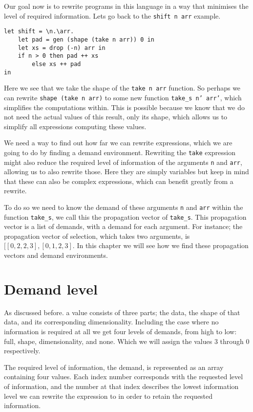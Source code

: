 \documentclass[../main.tex]{subfiles}
\begin{document}
Our goal now is to rewrite programs in this language in a way that minimises the level of required information. Lets go back to the \texttt{shift n arr} example.
\begin{verbatim}
let shift = \n.\arr.
    let pad = gen (shape (take n arr)) 0 in
    let xs = drop (-n) arr in
    if n > 0 then pad ++ xs
        else xs ++ pad
in
\end{verbatim}
%
Here we see that we take the shape of the \texttt{take n arr} function. So perhaps we can rewrite \texttt{shape (take n arr)} to some new function \texttt{take_s n' arr'}, which simplifies the computations within. This is possible because we know that we do not need the actual values of this result, only its shape, which allows us to simplify all expressions computing these values.

We need a way to find out how far we can rewrite expressions, which we are going to do by finding a demand environment.
Rewriting the \texttt{take} expression might also reduce the required level of information of the arguments \texttt{n} and \texttt{arr}, allowing us to also rewrite those. Here they are simply variables but keep in mind that these can also be complex expressions, which can benefit greatly from a rewrite.

To do so we need to know the demand of these arguments \texttt{n} and \texttt{arr} within the function \texttt{take_s}, we call this the propagation vector of \texttt{take\_s}. This propagation vector is a list of demands, with a demand for each argument. For instance; the propagation vector of selection, which takes two arguments, is $[[0,2,2,3], [0,1,2,3]$.
In this chapter we will see how we find these propagation vectors and demand environments.

\newpage
\section{Demand level}
As discussed before. a value consists of three parts; the data, the shape of that data, and its corresponding dimensionality. Including the case where no information is required at all we get four levels of demands, from high to low: full, shape, dimensionality, and none. Which we will assign the values $3$ through $0$ respectively.

The required level of information, the demand, is represented as an array containing four values. Each index number corresponds with the requested level of information, and the number at that index describes the lowest information level we can rewrite the expression to in order to retain the requested information.
\end{document}
